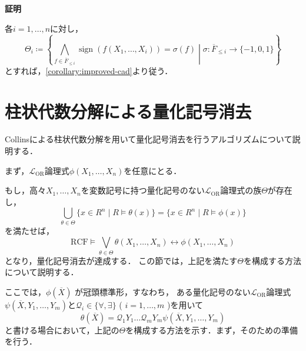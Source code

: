 \documentclass[uplatex, dvipdfmx]{jsarticle}
\makeatletter
\numberwithin{equation}{section}
\renewenvironment{proof}[1][\proofname]{\par
  \pushQED{\qed}%
  \normalfont \topsep6\p@\@plus6\p@\relax
  \trivlist
  \item\relax
  {\bfseries
  #1\@addpunct{.}}\hspace\labelsep\ignorespaces
}{
  \popQED\endtrivlist\@endpefalse
}
\newcommand{\Qua}{\mathcal{Q}}
\newcommand{\RCF}{\mathrm{RCF}}
\newcommand{\map}[3]{{#1}\colon{#2}\rightarrow{#3}}
\DeclareMathOperator{\sign}{sign}
\theoremstyle{definition}
\renewcommand{\proofname}{\textbf{証明}}
\makeatother
\begin{document}
\begin{proof}
     各$i=1, \dots, n$に対し，
     \begin{equation}
          \Theta_i \coloneqq \left\{ \bigwedge_{f \in \overline{F}_{\leq i}}\sign(f(X_1, \dots, X_i)) = \sigma(f) \middle| \map{\sigma}{\overline{F}_{\leq i}}{\{-1,0,1\}} \right\}
     \end{equation}
     とすれば，\cref{corollary:improved-cad}より従う．
\end{proof}


\section{柱状代数分解による量化記号消去}\label{section:8}

Collins\cite{MR0403962}による柱状代数分解を用いて量化記号消去を行うアルゴリズムについて説明する．

まず，$\mathcal{L}_\mathrm{OR}$論理式$\phi(X_1, \dots, X_n)$を任意にとる．

もし，高々$X_1, \dots, X_n$を変数記号に持つ量化記号のない$\mathcal{L}_\mathrm{OR}$論理式の族$\Theta$が存在し，
\begin{equation}
     \bigcup_{\theta \in \Theta}\{x \in R^n \mid R \models \theta(x)\} = \{x \in R^n \mid R \models \phi(x)\}
\end{equation}
を満たせば，
\begin{equation}
     \RCF \models \bigvee_{\theta \in \Theta} \theta(X_1, \dots, X_n) \leftrightarrow \phi(X_1, \dots, X_n)
\end{equation}
となり，量化記号消去が達成する．
この節では，上記を満たす$\Theta$を構成する方法について説明する．

ここでは，$\phi (\overline{X})$ が冠頭標準形，すなわち，
ある量化記号のない$\mathcal{L}_\mathrm{OR}$論理式$\psi(\overline{X}, Y_1, \dots, Y_m)$と$\Qua_i \in \{\forall, \exists\}$ ( $i=1, \dots, m$ )を用いて
\begin{equation}
     \theta(\overline{X}) = \Qua_1 Y_1 \dots \Qua_m Y_m \psi(\overline{X}, Y_1, \dots, Y_m)
\end{equation}
と書ける場合において，上記の$\Theta$を構成する方法を示す．まず，そのための準備を行う．
\end{document}
